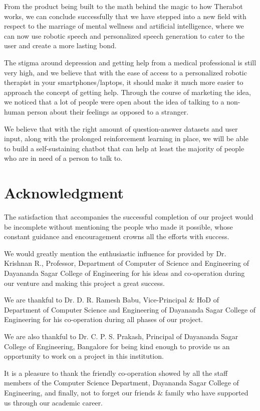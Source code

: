 \documentclass[conference,compsoc]{IEEEtran}
\begin{document}
From the product being built to the math behind the magic to how Therabot works, we can conclude successfully that we have stepped into a new field with respect to the marriage of mental wellness and artificial intelligence, where we can now use robotic speech and personalized speech generation to cater to the user and create a more lasting bond.

The stigma around depression and getting help from a medical professional is still very high, and we believe that with the ease of access to a personalized robotic therapist in your smartphones/laptops, it should make it much more easier to approach the concept of getting help. Through the course of marketing the idea, we noticed that a lot of people were open about the idea of talking to a non-human person about their feelings as opposed to a stranger.

We believe that with the right amount of question-answer datasets and user input, along with the prolonged reinforcement learning in place, we will be able to build a self-sustaining chatbot that can help at least the majority of people who are in need of a person to talk to.


\section{Acknowledgment}

The satisfaction that accompanies the successful completion of our project would be incomplete without mentioning the people who made it possible, whose constant guidance and encouragement crowns all the efforts with success.

We would greatly mention the enthusiastic influence for provided by Dr. Krishnan R., Professor, Department of Computer of Science and Engineering of Dayananda Sagar College of Engineering for his ideas and co-operation during our venture and making this project a great success.

We are thankful to Dr. D. R. Ramesh Babu, Vice-Principal \& HoD of Department of Computer Science and Engineering of Dayananda Sagar College of Engineering for his co-operation during all phases of our project.

We are also thankful to Dr. C. P. S. Prakash, Principal of Dayananda Sagar College of Engineering, Bangalore for being kind enough to provide us an opportunity to work on a project in this institution.

It is a pleasure to thank the friendly co-operation showed by all the staff members of the Computer Science Department, Dayananda Sagar College of Engineering, and finally, not to forget our friends \& family who have supported us through our academic career.

\printbibliography
\end{document}
